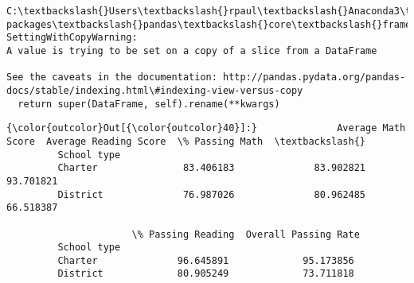 \documentclass[11pt]{article}
\begin{document}
    \begin{Verbatim}[commandchars=\\\{\}]
C:\textbackslash{}Users\textbackslash{}rpaul\textbackslash{}Anaconda3\textbackslash{}lib\textbackslash{}site-packages\textbackslash{}pandas\textbackslash{}core\textbackslash{}frame.py:3027: SettingWithCopyWarning: 
A value is trying to be set on a copy of a slice from a DataFrame

See the caveats in the documentation: http://pandas.pydata.org/pandas-docs/stable/indexing.html\#indexing-view-versus-copy
  return super(DataFrame, self).rename(**kwargs)

    \end{Verbatim}

\begin{Verbatim}[commandchars=\\\{\}]
{\color{outcolor}Out[{\color{outcolor}40}]:}              Average Math Score  Average Reading Score  \% Passing Math  \textbackslash{}
         School type                                                              
         Charter               83.406183              83.902821       93.701821   
         District              76.987026              80.962485       66.518387   
         
                      \% Passing Reading  Overall Passing Rate  
         School type                                           
         Charter              96.645891             95.173856  
         District             80.905249             73.711818  
\end{Verbatim}
            

    
    
    
    
\end{document}
